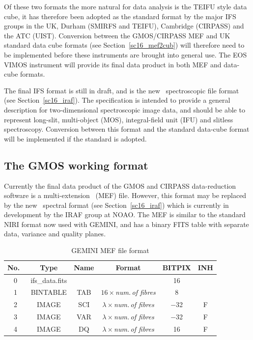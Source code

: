 \documentclass[twoside,11pt]{article}
\newcommand{\htmlref}[2]{#1}
\newcommand{\xlabel}[1]{}
\newcommand{\latex}[1]{#1}
\begin{document}
Of these two formats the more natural for data analysis is the TEIFU
style data cube, it has therefore been adopted as the standard format
by the major IFS groups in the UK, Durham (SMIRFS and TEIFU),
Cambridge (CIRPASS) and the ATC (UIST).
\htmlref{Conversion}{sc16_mef2cub} between the GMOS/CIRPASS MEF and UK
standard data cube formats\latex{ (see
Section~\ref{sc16_mef2cub})} will therefore need to be implemented
before these instruments are brought into general use.  The EOS VIMOS
instrument will provide its final data product in both MEF and
data-cube formats.

The final IFS format is still in draft, and is the new \IRAF\ 
spectroscopic \htmlref{file format}{sc16_iraf}\latex{
(see Section~\ref{sc16_iraf})}.  The specification is intended to
provide a general description for two-dimensional spectroscopic image
data, and should be able to represent long-slit, multi-object (MOS),
integral-field unit (IFU) and slitless spectroscopy.  Conversion
between this format and the standard data-cube format will be
implemented if the standard is adopted.

\subsection{\xlabel{sc16_gmosfile}The GMOS working format\label{sc16_gmosfile}}

Currently the final data product of the \htmlref{GMOS}{sc16_gmos} and
\htmlref{CIRPASS}{sc16_cirpass} data-reduction software is a
multi-extension \FITSref\ (MEF) file.  However, this format may be
replaced by the new \htmlref{\IRAF\ spectral
format}{sc16_iraf}\latex{ (see Section~\ref{sc16_iraf})} which is
currently in development by the IRAF group at NOAO.  The MEF is
similar to the standard NIRI format now used with GEMINI, and has a
binary FITS table with separate data, variance and quality planes.

\begin{table}[h]
\begin{center}
\begin{tabular}{cccccc}
No.\ & Type  & Name & Format & BITPIX & INH\\\hline 
0  & ifs\_data.fits &  &                                     &  16 &   \\
1  & BINTABLE  & TAB & $16 \times${\em num.\,of fibres}      &   8 &   \\    
2  & IMAGE     & SCI & $\lambda \times${\em num.\,of fibres} & $-$32 & F \\
3  & IMAGE     & VAR & $\lambda \times${\em num.\,of fibres} & $-$32 & F \\
4  & IMAGE     & DQ  & $\lambda \times${\em num.\,of fibres} &  16 & F \\ \hline
\end{tabular}
\caption{GEMINI MEF file format}
\end{center}
\protect\label{tab:mef_file}
\end{table} 
\end{document}
